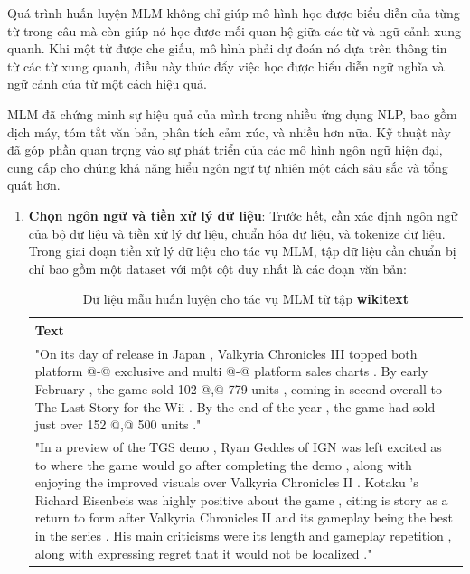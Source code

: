 \documentclass[a4paper, 12pt, openany]{book}
\begin{document}
Quá trình huấn luyện MLM không chỉ giúp mô hình học được biểu diễn của từng từ trong câu mà còn giúp nó học được mối quan hệ giữa các từ và ngữ cảnh xung quanh. Khi một từ được che giấu, mô hình phải dự đoán nó dựa trên thông tin từ các từ xung quanh, điều này thúc đẩy việc học được biểu diễn ngữ nghĩa và ngữ cảnh của từ một cách hiệu quả.

MLM đã chứng minh sự hiệu quả của mình trong nhiều ứng dụng NLP, bao gồm dịch máy, tóm tắt văn bản, phân tích cảm xúc, và nhiều hơn nữa. Kỹ thuật này đã góp phần quan trọng vào sự phát triển của các mô hình ngôn ngữ hiện đại, cung cấp cho chúng khả năng hiểu ngôn ngữ tự nhiên một cách sâu sắc và tổng quát hơn.
\begin{enumerate}
    \item \textbf{Chọn ngôn ngữ và tiền xử lý dữ liệu}: Trước hết, cần xác định ngôn ngữ của bộ dữ liệu và tiền xử lý dữ liệu, chuẩn hóa dữ liệu, và tokenize dữ liệu.
    Trong giai đoạn tiền xử lý dữ liệu cho tác vụ MLM, tập dữ liệu cần chuẩn bị chỉ bao gồm một dataset với một cột duy nhất là các đoạn văn bản:

    \begin{table}[H]
        \centering
        \begin{tabularx}{\textwidth}{|X|}
            \hline
                \textbf{Text}
            \\
            \hline
            "On its day of release in Japan , Valkyria Chronicles III topped both platform @-@ exclusive and multi @-@ platform sales charts . By early February , the game sold 102 @,@ 779 units , coming in second overall to The Last Story for the Wii . By the end of the year , the game had sold just over 152 @,@ 500 units ." \\ 
            \hline
            "In a preview of the TGS demo , Ryan Geddes of IGN was left excited as to where the game would go after completing the demo , along with enjoying the improved visuals over Valkyria Chronicles II . Kotaku 's Richard Eisenbeis was highly positive about the game , citing is story as a return to form after Valkyria Chronicles II and its gameplay being the best in the series . His main criticisms were its length and gameplay repetition , along with expressing regret that it would not be localized ." \\
            \hline
        \end{tabularx}
        \caption{Dữ liệu mẫu huấn luyện cho tác vụ MLM từ tập \textbf{wikitext} \cite{merity2016pointer}}
    \end{table}


\end{enumerate}
\end{document}
